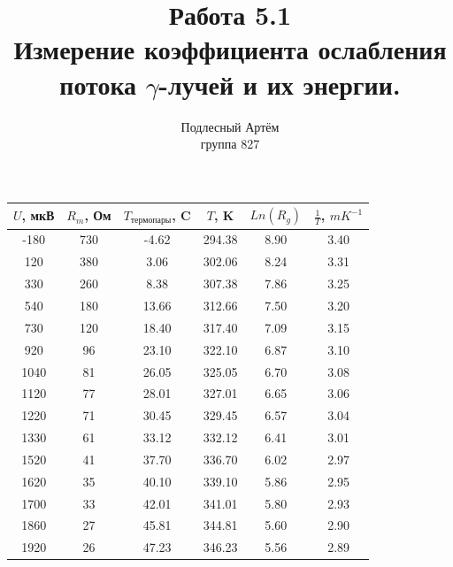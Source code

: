 \documentclass[a4paper, 14pt]{extarticle}%
\author{Подлесный Артём \\ группа 827}
\title{Работа 5.1 \\ Измерение коэффициента ослабления потока $\gamma$-лучей и их энергии.}
\begin{document}
\begin{table}[]
\begin{tabular}{|c|c|c|c|c|c|}
\hline
\rowcolor[HTML]{9698ED} 
$U$, мкВ & $R_m$, Ом & $T_{\text{термопары}}$, C & $T$, K & $Ln(R_g)$ & $\frac{1}{T}$, $mK^{-1}$ \\ \hline
-180     & 730       & -4.62                     & 294.38 & 8.90      & 3.40                     \\ \hline
\rowcolor[HTML]{CBCEFB} 
120      & 380       & 3.06                      & 302.06 & 8.24      & 3.31                     \\ \hline
330      & 260       & 8.38                      & 307.38 & 7.86      & 3.25                     \\ \hline
\rowcolor[HTML]{CBCEFB} 
540      & 180       & 13.66                     & 312.66 & 7.50      & 3.20                     \\ \hline
730      & 120       & 18.40                     & 317.40 & 7.09      & 3.15                     \\ \hline
\rowcolor[HTML]{CBCEFB} 
920      & 96        & 23.10                     & 322.10 & 6.87      & 3.10                     \\ \hline
1040     & 81        & 26.05                     & 325.05 & 6.70      & 3.08                     \\ \hline
\rowcolor[HTML]{CBCEFB} 
1120     & 77        & 28.01                     & 327.01 & 6.65      & 3.06                     \\ \hline
1220     & 71        & 30.45                     & 329.45 & 6.57      & 3.04                     \\ \hline
\rowcolor[HTML]{CBCEFB} 
1330     & 61        & 33.12                     & 332.12 & 6.41      & 3.01                     \\ \hline
1520     & 41        & 37.70                     & 336.70 & 6.02      & 2.97                     \\ \hline
\rowcolor[HTML]{CBCEFB} 
1620     & 35        & 40.10                     & 339.10 & 5.86      & 2.95                     \\ \hline
1700     & 33        & 42.01                     & 341.01 & 5.80      & 2.93                     \\ \hline
\rowcolor[HTML]{CBCEFB} 
1860     & 27        & 45.81                     & 344.81 & 5.60      & 2.90                     \\ \hline
1920     & 26        & 47.23                     & 346.23 & 5.56      & 2.89                     \\ \hline
\end{tabular}
\end{table}
\end{document}
